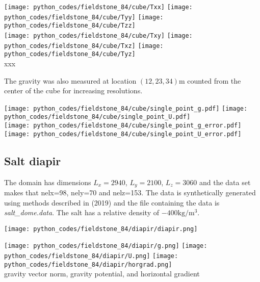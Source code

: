 \begin{center}
\texttt{[image: python\_codes/fieldstone\_84/cube/Txx]}
\texttt{[image: python\_codes/fieldstone\_84/cube/Tyy]}
\texttt{[image: python\_codes/fieldstone\_84/cube/Tzz]}\\
\texttt{[image: python\_codes/fieldstone\_84/cube/Txy]}
\texttt{[image: python\_codes/fieldstone\_84/cube/Txz]}
\texttt{[image: python\_codes/fieldstone\_84/cube/Tyz]}\\
{\captionfont  xxx}
\end{center}

The gravity was also measured at location $(12,23,34)\si{\metre}$ counted from the center of the cube
for increasing resolutions. 

\begin{center}
\texttt{[image: python\_codes/fieldstone\_84/cube/single\_point\_g.pdf]}
\texttt{[image: python\_codes/fieldstone\_84/cube/single\_point\_U.pdf]}\\
\texttt{[image: python\_codes/fieldstone\_84/cube/single\_point\_g\_error.pdf]}
\texttt{[image: python\_codes/fieldstone\_84/cube/single\_point\_U\_error.pdf]}\\
\end{center}


\newpage
\subsection*{Salt diapir}


The domain has dimensions $L_x=2940$, $L_y=2100$, $L_z=3060$ and the data set makes that  
nelx=98, nely=70 and nelz=153. The data is
synthetically generated using methods described in \textcite{clcc19} (2019)
and the file containing the data is {\sl salt\_dome.data}.
The salt has a relative density of $-400\si{\kg\per\cubic\metre}$.

\begin{center}
\texttt{[image: python\_codes/fieldstone\_84/diapir/diapir.png]}
\end{center}

\begin{center}
\texttt{[image: python\_codes/fieldstone\_84/diapir/g.png]}
\texttt{[image: python\_codes/fieldstone\_84/diapir/U.png]}
\texttt{[image: python\_codes/fieldstone\_84/diapir/horgrad.png]}\\
{\captionfont gravity vector norm, gravity potential, and horizontal gradient}
\end{center}


